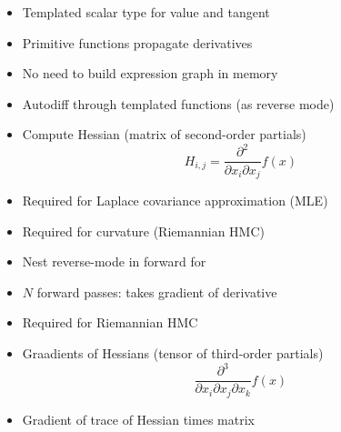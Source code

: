 \documentclass[10pt]{report}
\begin{document}
%
\begin{itemize}
\item Templated scalar type for value and tangent
\item Primitive functions propagate derivatives
\item No need to build expression graph in memory
\item Autodiff through templated functions (as reverse mode)
\end{itemize}

%
\begin{itemize}
\item Compute Hessian (matrix of second-order partials)
\[
H_{i,j} = \frac{\partial^2}{\partial x_i \partial x_j} f(x)
\]
\item Required for Laplace covariance approximation (MLE)
\item Required for curvature (Riemannian HMC)
\item Nest reverse-mode in forward for 
\item $N$ forward passes: takes gradient of derivative
\end{itemize}


%
\begin{itemize}
\item Required for Riemannian HMC
\item Graadients of Hessians (tensor of third-order partials)
\[
\frac{\partial^3}{\partial x_i \partial x_j \partial x_k} f(x)
\]
\vspace*{-12pt}
\end{itemize}


%
\begin{itemize}
\item Gradient of trace of Hessian times matrix
\end{itemize}
\end{document}
